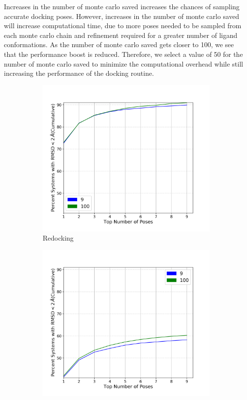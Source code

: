 \documentclass[journal=jcisd8,manuscript=article]{achemso}
\begin{document}
Increases in the number of monte carlo saved increases the chances of sampling accurate docking poses. However, increases in the number of monte carlo saved will increase computational time, due to more poses needed to be sampled from each monte carlo chain and refinement required for a greater number of ligand conformations. As the number of monte carlo saved gets closer to 100, we see that the performance boost is reduced. Therefore, we select a value of 50 for the number of monte carlo saved to minimize the computational overhead while still increasing the performance of the docking routine.  

\begin{figure}    
        \begin{subfigure}[b]{0.48\textwidth}    
		\centering
		\includegraphics[width=\textwidth]{figures/redocking/sweep_num_modes_line.png}
		\caption{Redocking}
		\label{fig:num modes rd}
        \end{subfigure}    
        \begin{subfigure}[b]{0.48\textwidth}    
		\centering
		\includegraphics[width=\textwidth]{figures/crossdocking/sweep_num_modes_line.png}

\end{subfigure}
\end{figure}
\end{document}
